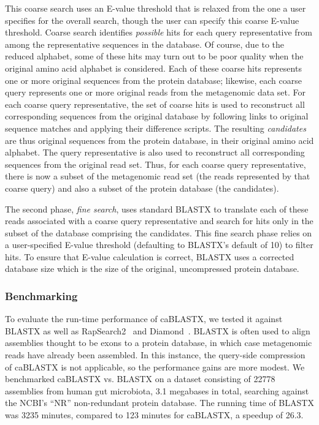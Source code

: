 \documentclass[review,preprint,12pt]{elsarticle}
\renewcommand{\cite}{\citep} %
\theoremstyle{definition}
\theoremstyle{remark}
\numberwithin{equation}{section}
\begin{document}
This coarse search uses an E-value threshold that is relaxed from the one a user
specifies for the overall search, though the user can specify this coarse 
E-value threshold.
Coarse search identifies \emph{possible} hits for each query representative from
among the representative sequences in the database.
Of course, due to the reduced alphabet, some of these hits may turn out to be
poor quality when the original amino acid alphabet is considered.
Each of these coarse hits represents one or more original sequences from the
protein database; likewise, each coarse query represents one or more original
reads from the metagenomic data set.
For each coarse query representative, the set of coarse hits is used to
reconstruct all corresponding sequences from the original database by following
links to original sequence matches and applying their difference scripts.
The resulting \emph{candidates} are thus original sequences from the protein
database, in their original amino acid alphabet.
The query representative is also used to reconstruct all corresponding sequences
from the original read set.
Thus, for each coarse query representative, there is now a subset of the
metagenomic read set (the reads represented by that coarse query) and also a
subset of the protein database (the candidates).

The second phase, \emph{fine search}, uses standard BLASTX to translate each
of these reads associated with a coarse query representative and search for
hits only in the subset of the database comprising the candidates.
This fine search phase relies on a user-specified E-value threshold (defaulting
to BLASTX's default of 10) to filter hits.
To ensure that E-value calculation is correct, BLASTX uses a corrected database
size which is the size of the original, uncompressed protein database.

\subsubsection{Benchmarking}

To evaluate the run-time performance of caBLASTX, we tested it against
BLASTX as well as RapSearch2~\cite{rs2} and Diamond~\cite{diamond}.
BLASTX is often used to align assemblies thought to be exons to a protein
database, in which case metagenomic reads have already been assembled.
In this instance, the query-side compression of caBLASTX is not applicable, so
the performance gains are more modest.
We benchmarked caBLASTX vs. BLASTX on a dataset consisting of 22778 assemblies
from human gut microbiota, 3.1 megabases in total, searching against the NCBI's
``NR'' non-redundant protein database.
The running time of BLASTX was 3235 minutes, compared to 123 minutes for caBLASTX, a speedup of 26.3.
\end{document}
